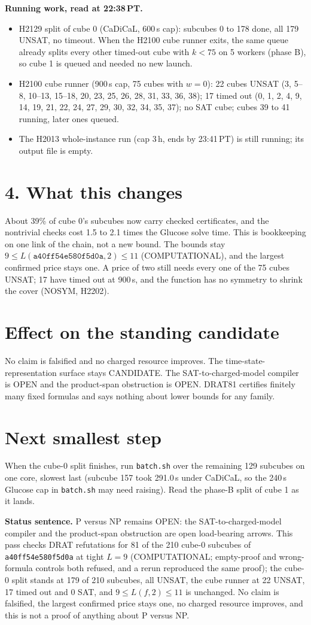 \documentclass[11pt]{article}
\begin{document}
\textbf{Running work, read at 22:38\,PT.}
\begin{itemize}
\item H2129 split of cube 0 (CaDiCaL, 600\,s cap): subcubes 0 to 178 done, all 179 UNSAT, no timeout. When the H2100 cube runner exits, the same queue already splits every other timed-out cube with $k<75$ on 5 workers (phase B), so cube 1 is queued and needed no new launch.
\item H2100 cube runner (900\,s cap, 75 cubes with $w=0$): 22 cubes UNSAT (3, 5--8, 10--13, 15--18, 20, 23, 25, 26, 28, 31, 33, 36, 38); 17 timed out (0, 1, 2, 4, 9, 14, 19, 21, 22, 24, 27, 29, 30, 32, 34, 35, 37); no SAT cube; cubes 39 to 41 running, later ones queued.
\item The H2013 whole-instance run (cap 3\,h, ends by 23:41\,PT) is still running; its output file is empty.
\end{itemize}

\section*{4. What this changes}
About 39\% of cube 0's subcubes now carry checked certificates, and the nontrivial checks cost 1.5 to 2.1 times the Glucose solve time. This is bookkeeping on one link of the chain, not a new bound. The bounds stay $9\le L(\texttt{a40ff54e580f5d0a},2)\le 11$ (COMPUTATIONAL), and the largest confirmed price stays one. A price of two still needs every one of the 75 cubes UNSAT; 17 have timed out at 900\,s, and the function has no symmetry to shrink the cover (NOSYM, H2202).

\section*{Effect on the standing candidate}
No claim is falsified and no charged resource improves. The time-state-representation surface stays CANDIDATE. The SAT-to-charged-model compiler is OPEN and the product-span obstruction is OPEN. DRAT81 certifies finitely many fixed formulas and says nothing about lower bounds for any family.

\section*{Next smallest step}
When the cube-0 split finishes, run \texttt{batch.sh} over the remaining 129 subcubes on one core, slowest last (subcube 157 took 291.0\,s under CaDiCaL, so the 240\,s Glucose cap in \texttt{batch.sh} may need raising). Read the phase-B split of cube 1 as it lands.

\bigskip
\noindent\textbf{Status sentence.} P versus NP remains OPEN: the SAT-to-charged-model compiler and the product-span obstruction are open load-bearing arrows. This pass checks DRAT refutations for 81 of the 210 cube-0 subcubes of \texttt{a40ff54e580f5d0a} at tight $L=9$ (COMPUTATIONAL; empty-proof and wrong-formula controls both refused, and a rerun reproduced the same proof); the cube-0 split stands at 179 of 210 subcubes, all UNSAT, the cube runner at 22 UNSAT, 17 timed out and 0 SAT, and $9\le L(f,2)\le 11$ is unchanged. No claim is falsified, the largest confirmed price stays one, no charged resource improves, and this is not a proof of anything about P versus NP.
\end{document}

